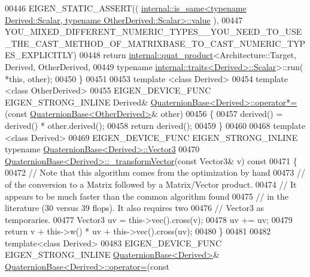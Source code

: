 \begin{DoxyCode}
00446   EIGEN\_STATIC\_ASSERT((
      \hyperlink{struct_eigen_1_1internal_1_1is__same}{internal::is\_same<typename Derived::Scalar, typename OtherDerived::Scalar>::value}
      ),
00447    
      YOU\_MIXED\_DIFFERENT\_NUMERIC\_TYPES\_\_YOU\_NEED\_TO\_USE\_THE\_CAST\_METHOD\_OF\_MATRIXBASE\_TO\_CAST\_NUMERIC\_TYPES\_EXPLICITLY)
00448   \textcolor{keywordflow}{return} \hyperlink{struct_eigen_1_1internal_1_1quat__product}{internal::quat\_product}<Architecture::Target, Derived, OtherDerived,
00449                          \textcolor{keyword}{typename} \hyperlink{struct_eigen_1_1internal_1_1traits}{internal::traits<Derived>::Scalar}>::run(
      *\textcolor{keyword}{this}, other);
00450 \}
00451 
00453 \textcolor{keyword}{template} <\textcolor{keyword}{class} Derived>
00454 \textcolor{keyword}{template} <\textcolor{keyword}{class} OtherDerived>
00455 EIGEN\_DEVICE\_FUNC EIGEN\_STRONG\_INLINE Derived& 
      \hyperlink{group___geometry___module_ad5fb3b0792f02b2863f4dc3c3c70ea2d}{QuaternionBase<Derived>::operator*= }(\textcolor{keyword}{const} 
      \hyperlink{group___geometry___module_class_eigen_1_1_quaternion_base}{QuaternionBase<OtherDerived>}& other)
00456 \{
00457   derived() = derived() * other.derived();
00458   \textcolor{keywordflow}{return} derived();
00459 \}
00460 
00468 \textcolor{keyword}{template} <\textcolor{keyword}{class} Derived>
00469 EIGEN\_DEVICE\_FUNC EIGEN\_STRONG\_INLINE \textcolor{keyword}{typename} \hyperlink{group___core___module}{QuaternionBase<Derived>::Vector3}
00470 \hyperlink{group___geometry___module_a03896e1e743aae2c18a0146086cef983}{QuaternionBase<Derived>::\_transformVector}(\textcolor{keyword}{const} Vector3& v)\textcolor{keyword}{ const}
00471 \textcolor{keyword}{}\{
00472     \textcolor{comment}{// Note that this algorithm comes from the optimization by hand}
00473     \textcolor{comment}{// of the conversion to a Matrix followed by a Matrix/Vector product.}
00474     \textcolor{comment}{// It appears to be much faster than the common algorithm found}
00475     \textcolor{comment}{// in the literature (30 versus 39 flops). It also requires two}
00476     \textcolor{comment}{// Vector3 as temporaries.}
00477     Vector3 uv = this->vec().cross(v);
00478     uv += uv;
00479     \textcolor{keywordflow}{return} v + this->w() * uv + this->vec().cross(uv);
00480 \}
00481 
00482 \textcolor{keyword}{template}<\textcolor{keyword}{class} Derived>
00483 EIGEN\_DEVICE\_FUNC EIGEN\_STRONG\_INLINE \hyperlink{group___geometry___module_class_eigen_1_1_quaternion_base}{QuaternionBase<Derived>}& 
      \hyperlink{group___geometry___module_class_eigen_1_1_quaternion_base}{QuaternionBase<Derived>::operator=}(\textcolor{keyword}{const} 

\end{DoxyCode}
